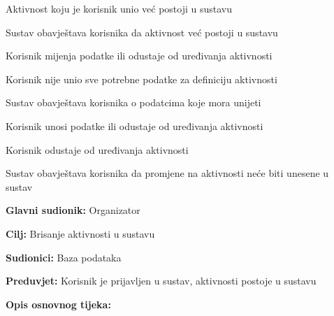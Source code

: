 \begin{packed_item}
\begin{packed_item}
\begin{packed_item}
							\item[6.a] Aktivnost koju je korisnik unio već postoji u sustavu
							\item[] \begin{packed_enum}
								
								\item Sustav obavještava korisnika da aktivnost već postoji u sustavu
								\item Korisnik mijenja podatke ili odustaje od uređivanja aktivnosti 
								
							\end{packed_enum}
							\item[6.b] Korisnik nije unio sve potrebne podatke za definiciju aktivnosti
							\item[] \begin{packed_enum}
								
								\item Sustav obavještava korisnika o podatcima koje mora unijeti
								\item Korisnik unosi podatke ili odustaje od uređivanja aktivnosti 
								
							\end{packed_enum}
							\item[3.a] Korisnik odustaje od uređivanja aktivnosti
							\item[] \begin{packed_enum}
								
								\item Sustav obavještava korisnika da promjene na aktivnosti neće biti unesene u sustav
								
							\end{packed_enum}
							
						\end{packed_item}
					\end{packed_item}
				
					\noindent {}
					\begin{packed_item}
						
						\item \textbf{Glavni sudionik: }Organizator
						\item  \textbf{Cilj:} Brisanje aktivnosti u sustavu
						\item  \textbf{Sudionici:} Baza podataka
						\item  \textbf{Preduvjet:} Korisnik je prijavljen u sustav, aktivnosti postoje u sustavu
						\item  \textbf{Opis osnovnog tijeka:}
						

\end{packed_item}
\end{packed_item}

